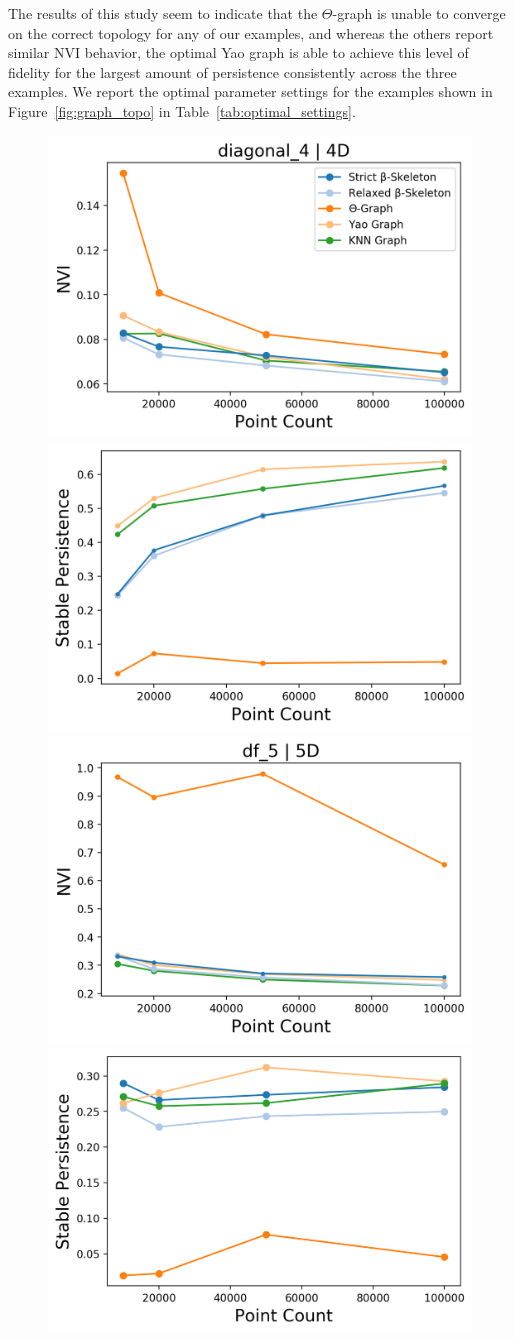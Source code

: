 The results of this study seem to indicate that the $\Theta$-graph is unable to converge on the correct topology for any of our examples, and whereas the others report similar NVI behavior, the optimal Yao graph is able to achieve this level of fidelity for the largest amount of persistence consistently across the three examples.
%
We report the optimal parameter settings for the examples shown in Figure~\ref{fig:graph_topo} in Table~\ref{tab:optimal_settings}.

\begin{figure}[htbp]
    \includegraphics[width=0.48\linewidth]{figs/chap7/diagonal_4_nvi.png}
    \includegraphics[width=0.48\linewidth]{figs/chap7/diagonal_4_stability.png}
    \includegraphics[width=0.48\linewidth]{figs/chap7/df_5_5D_nvi.png}
    \includegraphics[width=0.48\linewidth]{figs/chap7/df_5_5D.png}

\end{figure}
